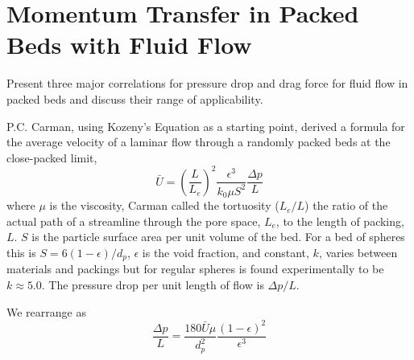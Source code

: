 \section{Momentum Transfer in Packed Beds with Fluid Flow} \label{sec:modeling-pressure-drop}
Present three major correlations for pressure drop and drag force for fluid flow in packed beds and discuss their range of applicability.








P.C. Carman\cite{Carman1997}, using Kozeny's Equation as a starting point, derived a formula for the average velocity of a laminar flow through a randomly packed beds at the close-packed limit,
\begin{equation}\label{eq:K-C-velocity}
    \bar{U} = \left(\frac{L}{L_e}\right)^2\frac{\epsilon^3}{k_0\mu S^2}\frac{\Delta p}{L}
\end{equation}
where $\mu$ is the viscosity, Carman called the tortuosity ($L_e/L$) the ratio of the actual path of a streamline through the pore space, $L_e$, to the length of packing, $L$. $S$ is the particle surface area per unit volume of the bed. For a bed of spheres this is $S = 6(1-\epsilon)/d_p$, $\epsilon$ is the void fraction, and constant, $k$, varies between materials and packings but for regular spheres is found experimentally to be $k\approx 5.0$. The pressure drop per unit length of flow is $\Delta p/L$.

We rearrange  as
\begin{equation}\label{eq:K-C-pressure}
    \frac{\Delta p}{L} = \frac{180 \bar{U} \mu}{d_p^2} \frac{(1-\epsilon)^2}{\epsilon^3}
\end{equation}

